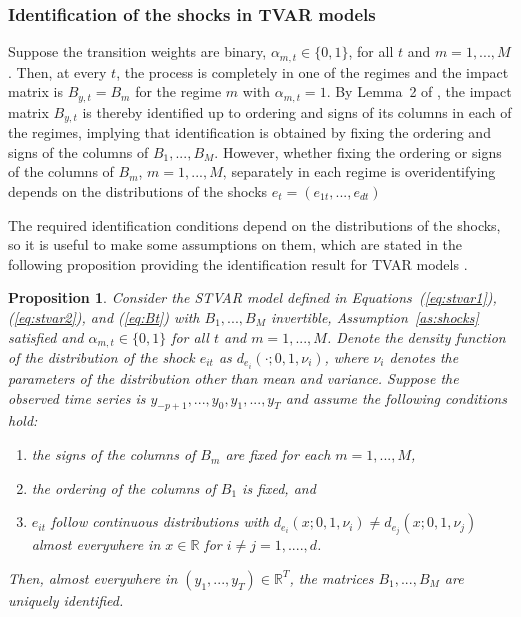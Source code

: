 \documentclass[nojss]{jss}
\newtheorem{proposition}{Proposition}
\begin{document}
\subsubsection{Identification of the shocks in TVAR models}\label{sec:identtvar}
Suppose the transition weights are binary, $\alpha_{m,t}\in\lbrace 0, 1\rbrace$, for all $t$ and $m=1,...,M$. Then, at every $t$, the process is completely in one of the regimes and the impact matrix is $B_{y,t}=B_m$ for the regime $m$ with $\alpha_{m,t}=1$. By Lemma~2 of \cite{Virolainen2:2024}, the impact matrix $B_{y,t}$ is thereby identified up to ordering and signs of its columns in each of the regimes, implying that identification is obtained by fixing the ordering and signs of the columns of $B_1,...,B_M$. However, whether fixing the ordering or signs of the columns of $B_m$, $m=1,...,M$‚ separately in each regime is overidentifying depends on the distributions of the shocks $e_t=(e_{1t},...,e_{dt})$ \citep[see the discussion in]{Virolainen2:2024}

The required identification conditions depend on the distributions of the shocks, so it is useful to make some assumptions on them, which are stated in the following proposition providing the identification result for TVAR models \citep[][Proposition~1]{Virolainen2:2024}.
\begin{proposition}\label{prop:tvar_ident}
Consider the STVAR model defined in Equations~(\ref{eq:stvar1}), (\ref{eq:stvar2}), and (\ref{eq:Bt}) with $B_1,...,B_M$ invertible, Assumption~\ref{as:shocks} satisfied and $\alpha_{m,t}\in\lbrace 0, 1\rbrace$ for all $t$ and $m=1,...,M$.
Denote the density function of the distribution of the shock $e_{it}$ as $d_{e_i}(\cdot ; 0, 1, \nu_i)$, where $\nu_i$ denotes the parameters of the distribution other than mean and variance.
Suppose the observed time series is $y_{-p+1},...,y_{0},y_{1},...,y_{T}$ and assume the following conditions hold:
\begin{enumerate}%
\item the signs of the columns of $B_m$ are fixed for each $m=1,...,M$, \label{cond:tvar_sign}
\item the ordering of the columns of $B_1$ is fixed, and\label{cond:tvar_B1}
\item $e_{it}$ follow continuous distributions with $d_{e_i}(x; 0, 1, \nu_i) \neq d_{e_j}(x; 0, 1, \nu_j)$ almost everywhere in $x\in\mathbb{R}$ for $i\neq j = 1,....,d$.\label{cond:tvar_dens}
\end{enumerate}
Then, almost everywhere in $(y_{1},...,y_{T}) \in \mathbb{R}^{T}$, the matrices $B_1,...,B_M$ are uniquely identified.
\end{proposition}
\end{document}
